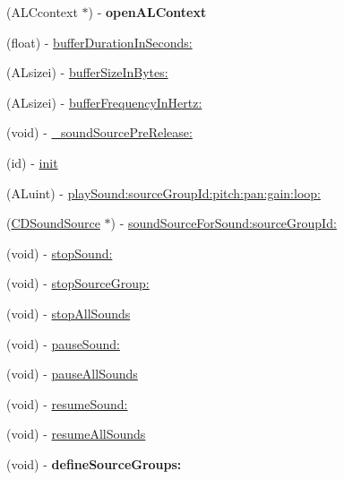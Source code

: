 \begin{DoxyCompactItemize}
(A\+L\+Ccontext $\ast$) -\/ {\bfseries open\+A\+L\+Context}
\item 
(float) -\/ \hyperlink{interfaceCDSoundEngine_a5731f4ec2052eb323ba1777f72c9da8c}{buffer\+Duration\+In\+Seconds\+:}
\item 
(A\+Lsizei) -\/ \hyperlink{interfaceCDSoundEngine_a91672bece24f10760d62cce27986573e}{buffer\+Size\+In\+Bytes\+:}
\item 
(A\+Lsizei) -\/ \hyperlink{interfaceCDSoundEngine_af8559b48f34ad22ba9a7cf27ffcb8648}{buffer\+Frequency\+In\+Hertz\+:}
\item 
(void) -\/ \hyperlink{interfaceCDSoundEngine_ad05b4a121e37fe36d3df453989be82af}{\+\_\+sound\+Source\+Pre\+Release\+:}
\item 
(id) -\/ \hyperlink{interfaceCDSoundEngine_a013cb9b6cf86c0dbfca8fac6aae0bd6a}{init}
\item 
(A\+Luint) -\/ \hyperlink{interfaceCDSoundEngine_a03aee643e250635e2594e5ced4fbe7b2}{play\+Sound\+:source\+Group\+Id\+:pitch\+:pan\+:gain\+:loop\+:}
\item 
(\hyperlink{interfaceCDSoundSource}{C\+D\+Sound\+Source} $\ast$) -\/ \hyperlink{interfaceCDSoundEngine_ab0c372cb85df05a4070b8f8bd2213efd}{sound\+Source\+For\+Sound\+:source\+Group\+Id\+:}
\item 
(void) -\/ \hyperlink{interfaceCDSoundEngine_ae2bbd23eefecd32afcf6bc0109b5e7a2}{stop\+Sound\+:}
\item 
(void) -\/ \hyperlink{interfaceCDSoundEngine_a5d6fbd530895fac2ce486a478e46fb23}{stop\+Source\+Group\+:}
\item 
(void) -\/ \hyperlink{interfaceCDSoundEngine_a8bbc63632a5e72c9235c39730e8efb38}{stop\+All\+Sounds}
\item 
(void) -\/ \hyperlink{interfaceCDSoundEngine_afd1f581938bf541447eaa9430712fff7}{pause\+Sound\+:}
\item 
(void) -\/ \hyperlink{interfaceCDSoundEngine_ac84ad4fe69381aa32b836f8a3a1b5e1f}{pause\+All\+Sounds}
\item 
(void) -\/ \hyperlink{interfaceCDSoundEngine_ad5ce097385bf2a6a347f418bfcbfeb54}{resume\+Sound\+:}
\item 
(void) -\/ \hyperlink{interfaceCDSoundEngine_a307f8d30e7fb5c7f29edbaea19709741}{resume\+All\+Sounds}
\item 
\mbox{\label{interfaceCDSoundEngine_a5940b79595deabff5cab67987133c518}} 
(void) -\/ {\bfseries define\+Source\+Groups\+:}
\item 
\mbox{\label{interfaceCDSoundEngine_a34ecd46964f13229c005cec18092be9f}} 

\end{DoxyCompactItemize}
